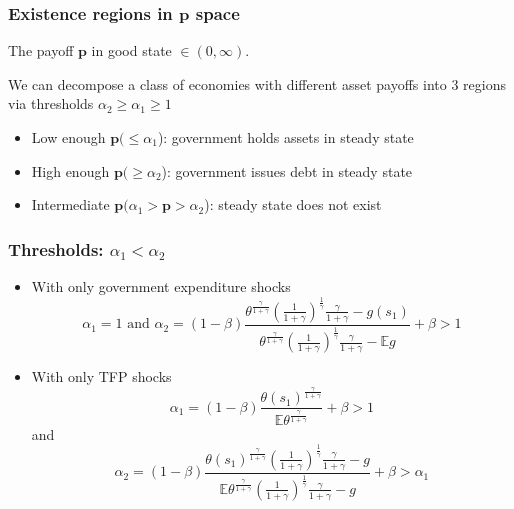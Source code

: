 \documentclass{beamer}
\newcommand{\EE}{\mathbb E}
\begin{document}
\begin{frame}
\frametitle{Existence regions in $\bm{p}$ space}

The payoff $\bm{p}$ in good state
$\in (0,\infty)$.

We can decompose a class of economies with different asset payoffs into 3 regions via thresholds $\alpha_2\geq\alpha_1\geq1$



  \begin{itemize}
   \item Low enough $\bm{p}(\leq \alpha_1$): government holds assets in steady state
   \item High enough $\bm{p} (\geq \alpha_2$): government  issues debt  in steady state
   \item Intermediate $\bm{p} (\alpha_1>\bm{p}>\alpha_2$): steady state does not exist
  \end{itemize}

 \end{frame}




\begin{frame}
 \frametitle{Thresholds: $\alpha_1 <\alpha_2$}
	\begin{itemize}
		\item With only government expenditure shocks
		\[
			\alpha_1 = 1 \text{  and }  \alpha_2 = (1-\beta)\frac{\theta^\frac{\gamma}{1+\gamma}\left(\frac{1}{1+\gamma}\right)^\frac1\gamma\frac{\gamma}{1+\gamma}-g(s_1)}{\theta^\frac{\gamma}{1+\gamma}\left(\frac{1}{1+\gamma}\right)^\frac1\gamma\frac{\gamma}{1+\gamma}-\EE g} +\beta>1
		\]
		\item With only TFP shocks
		\[
			\alpha_1 = (1-\beta)\frac{\theta(s_1)^\frac{\gamma}{1+\gamma}}{\EE\theta^\frac{\gamma}{1+\gamma}}+\beta > 1
		\]and
		\[
		\alpha_2 = (1-\beta)\frac{\theta(s_1)^\frac{\gamma}{1+\gamma}\left(\frac{1}{1+\gamma}\right)^\frac1\gamma\frac{\gamma}{1+\gamma}-g}{\EE\theta^\frac{\gamma}{1+\gamma}\left(\frac{1}{1+\gamma}\right)^\frac1\gamma\frac{\gamma}{1+\gamma}-g}+\beta>\alpha_1
		\]
	\end{itemize}
 \end{frame}
\end{document}
